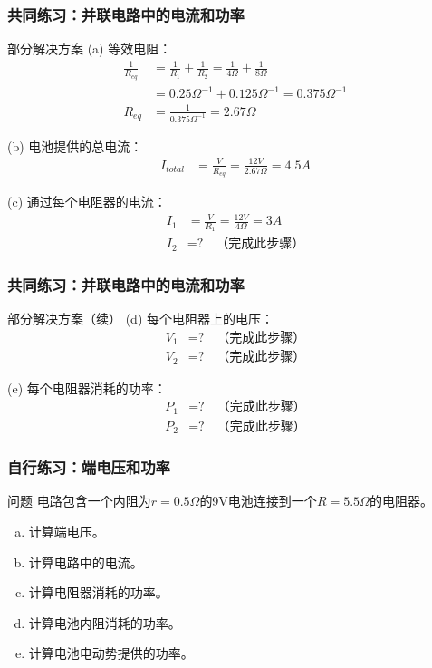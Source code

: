 \documentclass{beamer}
\begin{document}
\begin{frame}
    \frametitle{共同练习：并联电路中的电流和功率}
    \begin{block}{部分解决方案}
        (a) 等效电阻：
        \begin{align*}
            \frac{1}{R_{eq}} &= \frac{1}{R_1} + \frac{1}{R_2} = \frac{1}{4\Omega} + \frac{1}{8\Omega}\\
            &= 0.25\Omega^{-1} + 0.125\Omega^{-1} = 0.375\Omega^{-1}\\
            R_{eq} &= \frac{1}{0.375\Omega^{-1}} = 2.67\Omega
        \end{align*}
        
        (b) 电池提供的总电流：
        \begin{align*}
            I_{total} &= \frac{V}{R_{eq}} = \frac{12V}{2.67\Omega} = 4.5A
        \end{align*}
        
        (c) 通过每个电阻器的电流：
        \begin{align*}
            I_1 &= \frac{V}{R_1} = \frac{12V}{4\Omega} = 3A\\
            I_2 &= \text{?} \quad \text{（完成此步骤）}
        \end{align*}
    \end{block}
\end{frame}

\begin{frame}
    \frametitle{共同练习：并联电路中的电流和功率}
    \begin{block}{部分解决方案（续）}
        (d) 每个电阻器上的电压：
        \begin{align*}
            V_1 &= \text{?} \quad \text{（完成此步骤）}\\
            V_2 &= \text{?} \quad \text{（完成此步骤）}
        \end{align*}
        
        (e) 每个电阻器消耗的功率：
        \begin{align*}
            P_1 &= \text{?} \quad \text{（完成此步骤）}\\
            P_2 &= \text{?} \quad \text{（完成此步骤）}
        \end{align*}
    \end{block}
\end{frame}

\begin{frame}
    \frametitle{自行练习：端电压和功率}
    \begin{block}{问题}
        电路包含一个内阻为$r = 0.5\Omega$的9V电池连接到一个$R = 5.5\Omega$的电阻器。
        \begin{enumerate}[(a)]
            \item 计算端电压。
            \item 计算电路中的电流。
            \item 计算电阻器消耗的功率。
            \item 计算电池内阻消耗的功率。
            \item 计算电池电动势提供的功率。
        \end{enumerate}
    \end{block}
\end{frame}
\end{document}
